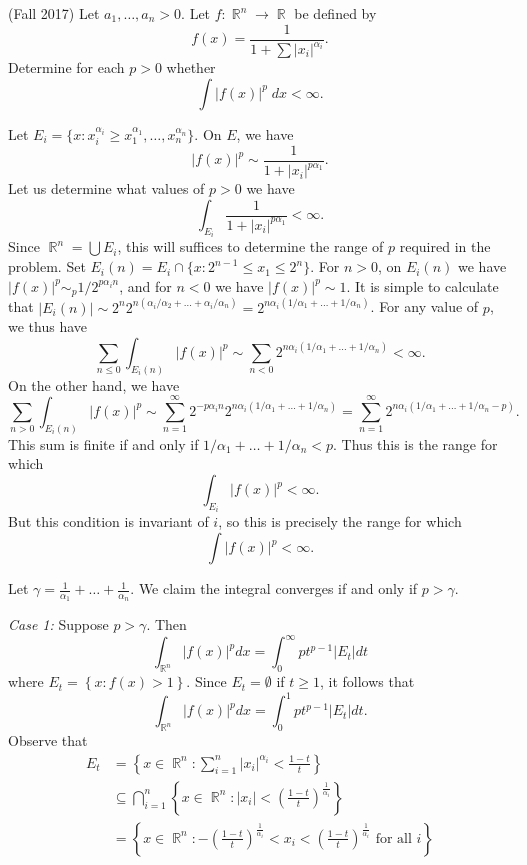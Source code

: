 \documentclass[answers]{exam}
\DeclareMathOperator{\RR}{\mathbb{R}}
\begin{document}
\begin{questions}
\question (Fall 2017) Let $a_1, \dots, a_n > 0$. Let $f: \RR^n \to \RR$ be defined by
%
\[ f(x) = \frac{1}{1 + \sum |x_i|^{\alpha_i}}. \]
%
Determine for each $p > 0$ whether
%
\[ \int |f(x)|^p\; dx < \infty. \]
\begin{solution}
	Let $E_i = \{ x: x_i^{\alpha_i} \geq x_1^{\alpha_1}, \dots, x_n^{\alpha_n} \}$. On $E$, we have
	\[ |f(x)|^p \sim \frac{1}{1 + |x_i|^{p \alpha_1}}. \]
	Let us determine what values of $p > 0$ we have
	\[ \int_{E_i} \frac{1}{1 + |x_i|^{p \alpha_1}} < \infty.  \]
	Since $\RR^n = \bigcup E_i$, this will suffices to determine the range of $p$ required in the problem. Set $E_i(n) = E_i \cap \{ x : 2^{n-1} \leq x_1 \leq 2^n \}$. For $n > 0$, on $E_i(n)$ we have $|f(x)|^p \sim_p 1/2^{p \alpha_i n}$, and for $n < 0$ we have $|f(x)|^p \sim 1$. It is simple to calculate that $|E_i(n)| \sim 2^n 2^{n(\alpha_i/\alpha_2 + \dots + \alpha_i / \alpha_n)} = 2^{n \alpha_i (1/\alpha_1 + \dots + 1/\alpha_n)}$. For any value of $p$, we thus have
	\[ \sum_{n \leq 0} \int_{E_i(n)} |f(x)|^p \sim \sum_{n < 0} 2^{n \alpha_i (1/\alpha_1 + \dots + 1/\alpha_n)} < \infty. \]
	On the other hand, we have
	\[ \sum_{n > 0} \int_{E_i(n)} |f(x)|^p \sim \sum_{n = 1}^\infty 2^{-p\alpha_i n} 2^{n \alpha_i(1/\alpha_1 + \dots + 1/\alpha_n)} = \sum_{n = 1}^\infty 2^{n \alpha_i(1/\alpha_1 + \dots + 1/\alpha_n -p)}. \]
	This sum is finite if and only if $1/\alpha_1 + \dots + 1/\alpha_n < p$. Thus this is the range for which
	\[ \int_{E_i} |f(x)|^p < \infty. \]
	But this condition is invariant of $i$, so this is precisely the range for which
	\[ \int |f(x)|^p < \infty. \]
\end{solution}

\begin{solution}

Let $\gamma=\frac{1}{\alpha_{1}}+\ldots+\frac{1}{\alpha_{n}}$. We claim the integral converges if and only if $p>\gamma$.

\textit{Case 1:} Suppose $p>\gamma$. Then
\begin{equation*}
  \int_{\RR^{n}} |f(x)|^{p}dx = \int_{0}^{\infty}p t^{p-1}|E_{t}|dt
\end{equation*}
where $E_{t}= \left\{ x: f(x)>1 \right\}$. Since $E_{t}=\emptyset$ if $t\geq 1$, it follows that
\begin{equation}\label{eq:10000}
  \int_{\RR^{n}} |f(x)|^{p}dx = \int_{0}^{1}p t^{p-1}|E_{t}|dt.
\end{equation}
Observe that
\begin{align*}
  E_{t}
  &= \left\{ x\in \RR^{n} : \sum_{i=1}^{n}|x_{i}|^{\alpha_{i}}< \frac{1-t}{t} \right\} \\
  &\subseteq \bigcap_{i=1}^{n}\left\{ x\in \RR^{n}: |x_{i}| < \left(\frac{1-t}{t}\right)^{\frac{1}{\alpha_{i}}} \right\}\\
  &= \left\{ x\in \RR^{n}:  -\left(\frac{1-t}{t}\right)^{\frac{1}{\alpha_{i}}} < x_{i}< \left(\frac{1-t}{t}\right)^{\frac{1}{\alpha_{i}}} \text{ for all }i\right\}
\end{align*}


\end{solution}
\end{questions}
\end{document}
